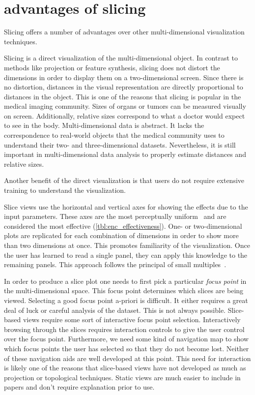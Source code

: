 \section{advantages of slicing}
\label{sec:slicing-advantages}

Slicing offers a number of advantages over other multi-dimensional
visualization techniques. 

Slicing is a direct visualization of the multi-dimensional object. In contrast
to methods like projection or feature synthesis, slicing does not distort the
dimensions in order to display them on a two-dimensional screen. Since there is
no distortion, distances in the visual representation are directly proportional
to distances in the object. This is one of the reasons that slicing is popular
in the medical imaging community. Sizes of organs or tumors can be measured
visually on screen. Additionally, relative sizes correspond to what a doctor
would expect to see in the body. Multi-dimensional data is abstract. It lacks
the correspondence to real-world objects that the medical community uses to
understand their two- and three-dimensional datasets.  Nevertheless, it is
still important in multi-dimensional data analysis to properly estimate
distances and relative sizes. 

Another benefit of the direct visualization is that users do not require
extensive training to understand the visualization.  

Slice views use the horizontal and vertical axes for showing the effects due to
the input parameters. These axes are the most perceptually uniform~\cite{ref}
and are considered the most effective (\autoref{tbl:enc_effectiveness}).
One- or two-dimensional plots are replicated for each combination of dimensions
in order to show more than two dimensions at once. This promotes familiarity
of the visualization. Once the user has learned to read a single panel, they
can apply this knowledge to the remaining panels. This approach follows the
principal of small multiples~\cite{ref}.

In order to produce a slice plot one needs to first pick a particular
\emph{focus point} in the multi-dimensional space. This focus point determines
which slices are being viewed. Selecting a good focus point a-priori is
difficult. It either requires a great deal of luck or careful analysis of the
dataset. This is not always possible. Slice-based views require some sort of
interactive focus point selection. Interactively browsing through the slices
requires interaction controls to give the user control over the focus point.
Furthermore, we need some kind of navigation map to show which focus points the
user has selected so that they do not become lost. Neither of these navigation
aids are well developed at this point. This need for interaction is likely one
of the reasons that slice-based views have not developed as much as projection
or topological techniques. Static views are much easier to include in papers
and don't require explanation prior to use.

